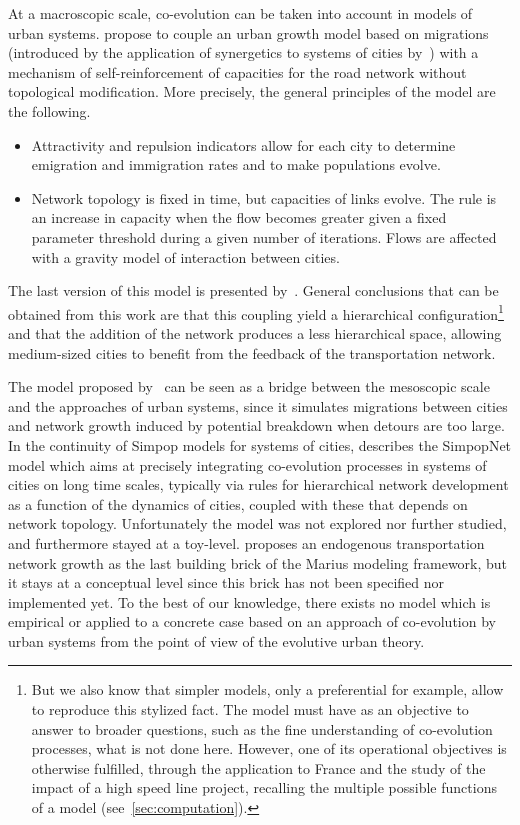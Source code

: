 \documentclass[galley]{jtlu-article-2col}
\begin{document}
At a macroscopic scale, co-evolution can be taken into account in models of urban systems. \cite{baptiste1999interactions} propose to couple an urban growth model based on migrations (introduced by the application of synergetics to systems of cities by~\cite{sanders1992systeme}) with a mechanism of self-reinforcement of capacities for the road network without topological modification. More precisely, the general principles of the model are the following.
\begin{itemize}
\item Attractivity and repulsion indicators allow for each city to determine emigration and immigration rates and to make populations evolve.
\item Network topology is fixed in time, but capacities of links evolve. The rule is an increase in capacity when the flow becomes greater given a fixed parameter threshold during a given number of iterations. Flows are affected with a gravity model of interaction between cities.
\end{itemize}


The last version of this model is presented by~\cite{baptistemodeling}. General conclusions that can be obtained from this work are that this coupling yield a hierarchical configuration\footnote{But we also know that simpler models, only a preferential for example, allow to reproduce this stylized fact. The model must have as an objective to answer to broader questions, such as the fine understanding of co-evolution processes, what is not done here. However, one of its operational objectives is otherwise fulfilled, through the application to France and the study of the impact of a high speed line project, recalling the multiple possible functions of a model (see~\ref{sec:computation}).} and that the addition of the network produces a less hierarchical space, allowing medium-sized cities to benefit from the feedback of the transportation network.


The model proposed by~\cite{blumenfeld2010network} can be seen as a bridge between the mesoscopic scale and the approaches of urban systems, since it simulates migrations between cities and network growth induced by potential breakdown when detours are too large. In the continuity of Simpop models for systems of cities, \cite{schmitt2014modelisation} describes the SimpopNet model which aims at precisely integrating co-evolution processes in systems of cities on long time scales, typically via rules for hierarchical network development as a function of the dynamics of cities, coupled with these that depends on network topology. Unfortunately the model was not explored nor further studied, and furthermore stayed at a toy-level. \cite{cottineau2014evolution} proposes an endogenous transportation network growth as the last building brick of the Marius modeling framework, but it stays at a conceptual level since this brick has not been specified nor implemented yet. To the best of our knowledge, there exists no model which is empirical or applied to a concrete case based on an approach of co-evolution by urban systems from the point of view of the evolutive urban theory.
\end{document}
